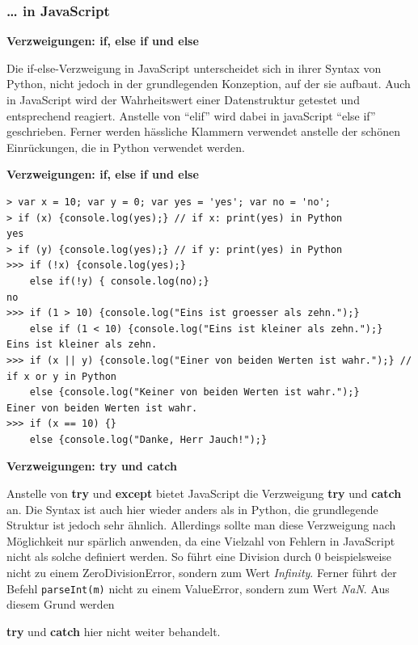 \subsubsection{\ldots{} in JavaScript}

\par\noindent\textbf{Verzweigungen: if, else if und else}

Die if-else-Verzweigung in JavaScript unterscheidet sich in ihrer Syntax
von Python, nicht jedoch in der grundlegenden Konzeption, auf der sie
aufbaut. Auch in JavaScript wird der Wahrheitswert einer Datenstruktur
getestet und entsprechend reagiert. Anstelle von ``elif'' wird dabei in
javaScript ``else if'' geschrieben. Ferner werden hässliche Klammern
verwendet anstelle der schönen Einrückungen, die in Python verwendet
werden.




\par\noindent\textbf{Verzweigungen: if, else if und else}

\begin{verbatim}
> var x = 10; var y = 0; var yes = 'yes'; var no = 'no';
> if (x) {console.log(yes);} // if x: print(yes) in Python
yes
> if (y) {console.log(yes);} // if y: print(yes) in Python 
>>> if (!x) {console.log(yes);}
    else if(!y) { console.log(no);}
no
>>> if (1 > 10) {console.log("Eins ist groesser als zehn.");}
    else if (1 < 10) {console.log("Eins ist kleiner als zehn.");}
Eins ist kleiner als zehn.
>>> if (x || y) {console.log("Einer von beiden Werten ist wahr.");} // if x or y in Python
    else {console.log("Keiner von beiden Werten ist wahr.");}
Einer von beiden Werten ist wahr.
>>> if (x == 10) {}
    else {console.log("Danke, Herr Jauch!");}
\end{verbatim}




\par\noindent\textbf{Verzweigungen: try und catch}

Anstelle von \textbf{try} und \textbf{except} bietet JavaScript die
Verzweigung \textbf{try} und \textbf{catch} an. Die Syntax ist auch hier
wieder anders als in Python, die grundlegende Struktur ist jedoch sehr
ähnlich. Allerdings sollte man diese Verzweigung nach Möglichkeit nur
spärlich anwenden, da eine Vielzahl von Fehlern in JavaScript nicht als
solche definiert werden. So führt eine Division durch 0 beispielsweise
nicht zu einem ZeroDivisionError, sondern zum Wert \emph{Infinity}.
Ferner führt der Befehl
\texttt{parseInt(\textquotesingle{}m\textquotesingle{})} nicht zu einem
ValueError, sondern zum Wert \emph{NaN}. Aus diesem Grund werden
\par\noindent\textbf{try} und \textbf{catch} hier nicht weiter behandelt.




